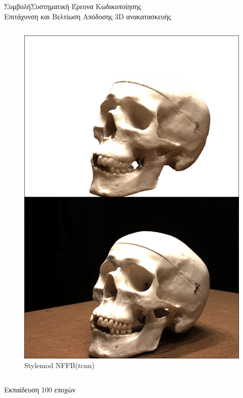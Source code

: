 \documentclass[10pt]{beamer}
\begin{document}
\begin{frame}{Συμβολή}{Συστηματική Έρευνα Κωδικοποίησης \\ Επιτάχυνση και Βελτίωση Απόδοσης 3D ανακατασκευής}
{\begin{columns}
\begin{figure}
              \includegraphics[height=.42\textheight]{images/RenderComparison65/NFFBTCNN/rendering_100.jpg}
                \caption{\tiny{Stylemod NFFB(tcnn)}}
            \end{figure}
    \end{columns}}
    Εκπαίδευση 100 εποχών
\end{frame}
\end{document}
